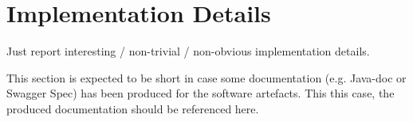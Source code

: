 \section{Implementation Details}

Just report interesting / non-trivial / non-obvious implementation details.

This section is expected to be short in case some documentation (e.g. Java-doc or Swagger Spec) has been produced for the software artefacts.
%
This this case, the produced documentation should be referenced here.